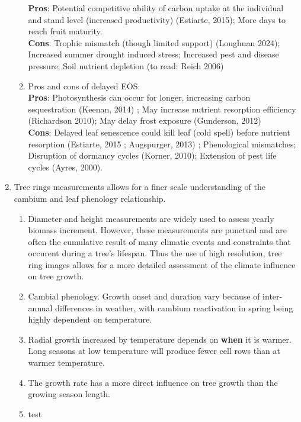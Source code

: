 \documentclass{article}
\begin{document}
\begin{enumerate}
\begin{enumerate}
\textbf{Pros}: Potential competitive ability of carbon uptake at the individual and stand level (increased productivity) (Estiarte, 2015); More days to reach fruit maturity. \\ 
\textbf{Cons}: Trophic mismatch (though limited support) (Loughnan 2024); Increased summer drought induced stress; Increased pest and disease pressure; Soil nutrient depletion (to read: Reich 2006)
\item Pros and cons of delayed EOS: \\
\textbf{Pros}: Photosynthesis can occur for longer, increasing carbon sequestration (Keenan, 2014) ; May increase nutrient resorption efficiency (Richardson 2010); May delay frost exposure (Gunderson, 2012)\\ 
\textbf{Cons}: Delayed leaf senescence could kill leaf (cold spell) before nutrient resorption (Estiarte, 2015 ; Augspurger, 2013) ; Phenological mismatches; Disruption of dormancy cycles (Korner, 2010); Extension of pest life cycles (Ayres, 2000).
\end{enumerate}

\item Tree rings measurements allows for a finer scale understanding of the cambium and leaf phenology relationship.
\begin{enumerate}
\item  Diameter and height measurements are widely used to assess yearly biomass increment. However, these measurements are punctual and are often the cumulative result of many climatic events and constraints that occurent during a tree's lifespan. Thus the use of high resolution, tree ring images allows for a more detailed assessment of the climate influence on tree growth.
\item Cambial phenology. Growth onset and duration vary because of inter-annual differences in weather, with cambium reactivation in spring being highly dependent on temperature. 
\item Radial growth increased by temperature depends on \textbf{when} it is warmer. Long seasons at low temperature will produce fewer cell rows than at warmer temperature. 
\item The growth rate has a more direct influence on tree growth than the growing season length. 
\item test
\end{enumerate}

\end{enumerate}
\end{document}
